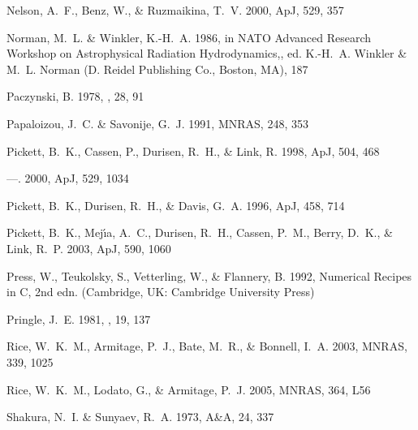 \documentclass[manuscript]{aastex}
\begin{document}
\begin{thebibliography}{66}
{Nelson}, A.~F., {Benz}, W., \& {Ruzmaikina}, T.~V. 2000, ApJ, 529, 357

{Norman}, M.~L. \& {Winkler}, K.-H.~A. 1986, in NATO Advanced Research Workshop
  on Astrophysical Radiation Hydrodynamics,, ed. K.-H.~A. {Winkler} \& M.~L.
  {Norman} (D. Reidel Publishing Co., Boston, MA), 187

{Paczynski}, B. 1978, \actaa, 28, 91

{Papaloizou}, J.~C. \& {Savonije}, G.~J. 1991, MNRAS, 248, 353

{Pickett}, B.~K., {Cassen}, P., {Durisen}, R.~H., \& {Link}, R. 1998, ApJ, 504,
  468

---. 2000, ApJ, 529, 1034

{Pickett}, B.~K., {Durisen}, R.~H., \& {Davis}, G.~A. 1996, ApJ, 458, 714

{Pickett}, B.~K., {Mej{\'{\i}}a}, A.~C., {Durisen}, R.~H., {Cassen}, P.~M.,
  {Berry}, D.~K., \& {Link}, R.~P. 2003, ApJ, 590, 1060

Press, W., Teukolsky, S., Vetterling, W., \& Flannery, B. 1992, {Numerical
  Recipes in C}, 2nd edn. (Cambridge, UK: Cambridge University Press)

{Pringle}, J.~E. 1981, \araa, 19, 137

{Rice}, W.~K.~M., {Armitage}, P.~J., {Bate}, M.~R., \& {Bonnell}, I.~A. 2003,
  MNRAS, 339, 1025

{Rice}, W.~K.~M., {Lodato}, G., \& {Armitage}, P.~J. 2005, MNRAS, 364, L56

{Shakura}, N.~I. \& {Sunyaev}, R.~A. 1973, A\&A, 24, 337


\end{thebibliography}
\end{document}

